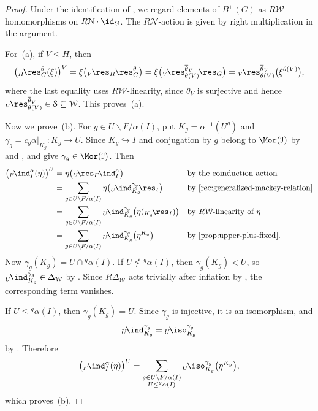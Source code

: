 \documentclass{amsart}
\numberwithin{equation}{section}%
\theoremstyle{remark}
\theoremstyle{definition}
\newcommand{\n}{\mathcal N}
\newcommand{\w}{\mathcal W}
\newcommand{\lind}[1]{{}_{#1}\!\ind}
\newcommand{\lres}[1]{{}_{#1}\!\res}
\newcommand{\liso}[1]{{}_{#1}\!\iso}
\newcommand{\ol}[1]{\overline{#1}}
\begin{document}
%
\begin{proof}
Under the identification of
, we regard elements of $B^+(G)$ as
$R\w$-homomorphisms on $R\n\cdot\id_G$.
The $R\n$-action is given by right multiplication in the argument.

For~(a), if $V\leq H$, then
%
\[
\bigl(\lres{H}_G^\theta(\xi)\bigr)^V
=
\xi\bigl(\lres{V}_H\lres{}_G^\theta\bigr)
=
\xi\bigl(
\lres{V}_{\theta(V)}^{\ol{\theta}_V}
\lres{}_G
\bigr)
=
\lres{V}_{\theta(V)}^{\ol{\theta}_V}
\bigl(\xi^{\theta(V)}\bigr),
\]
%
where the last equality uses $R\w$-linearity, since
$\ol{\theta}_V$ is surjective and hence
$\lres{V}_{\theta(V)}^{\ol{\theta}_V}\in\mathcal S\subseteq\mathcal W$.
This proves~(a).

Now we prove~(b).
For $g\in U\backslash F/\alpha(I)$, put
$K_g=\alpha^{-1}(U^g)$ and
$\gamma_g=c_g\alpha|_{K_g}\colon K_g\to U$.
Since $K_g\hookrightarrow I$ and conjugation by $g$ belong to
$\Mor(\mathcal I)$ by  and ,
 and  give
$\gamma_g\in\Mor(\mathcal I)$.
Then
%
\[
\begin{aligned}
\bigl(\lind{F}_I^\alpha(\eta)\bigr)^U
&=
\eta\bigl(\lres{U}_F\lind{}_I^\alpha\bigr)
&&\text{by the coinduction action}
\\
&=
\sum_{g\in U\backslash F/\alpha(I)}
\eta\bigl(
\lind{U}_{K_g}^{\gamma_g}\!\lres{}_I
\bigr)
&&\text{by \Cref{rec:generalized-mackey-relation}}
\\
&=
\sum_{g\in U\backslash F/\alpha(I)}
\lind{U}_{K_g}^{\gamma_g}
\bigl(\eta(\lres{K_g}_I)\bigr)
&&\text{by $R\w$-linearity of $\eta$}
\\
&=
\sum_{g\in U\backslash F/\alpha(I)}
\lind{U}_{K_g}^{\gamma_g}
\bigl(\eta^{K_g}\bigr)
&&\text{by \Cref{prop:upper-plus-fixed}.}
\end{aligned}
\]
%
Now
$\gamma_g(K_g)=U\cap{}^g\alpha(I)$.
If $U\not\leq{}^g\alpha(I)$, then
$\gamma_g(K_g)<U$, so
$\lind{U}_{K_g}^{\gamma_g}\in\Delta_\w$ by
.
Since $R\Delta_\w$ acts trivially after inflation by
, the corresponding term vanishes.

If $U\leq{}^g\alpha(I)$, then
$\gamma_g(K_g)=U$.
Since $\gamma_g$ is injective, it is an isomorphism, and
\[
\lind{U}_{K_g}^{\gamma_g}
=
\liso{U}_{K_g}^{\gamma_g}
\]
by .
Therefore
%
\[
\bigl(\lind{F}_I^\alpha(\eta)\bigr)^U
=
\sum_{\substack{
	g\in U\backslash F/\alpha(I)\\
	U\leq{}^g\alpha(I)
}}
\liso{U}_{K_g}^{\gamma_g}
\bigl(\eta^{K_g}\bigr),
\]
%
which proves~(b).
\end{proof}
\end{document}
